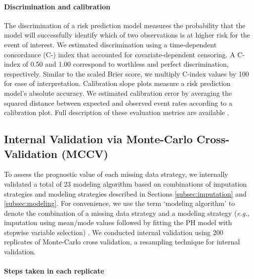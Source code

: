 \documentclass{article}
\begin{document}
\paragraph{Discrimination and calibration}

The discrimination of a risk prediction model measures the probability
that the model will successfully identify which of two observations is
at higher risk for the event of interest. We estimated discrimination
using a time-dependent concordance (C-) index that accounted for
covariate-dependent censoring. A C-index of 0.50 and 1.00 correspond to
worthless and perfect discrimination, respectively. Similar to the
scaled Brier score, we multiply C-index values by 100 for ease of
interpretation. Calibration slope plots measure a risk prediction
model's absolute accuracy. We estimated calibration error by averaging
the squared distance between expected and observed event rates according
to a calibration plot. Full description of these evaluation metrics are
available \cite{gerds2014calibration, gerds2013estimating}.

\hypertarget{internal-validation-via-monte-carlo-cross-validation-mccv}{%
\subsection{Internal Validation via Monte-Carlo Cross-Validation
(MCCV)}\label{internal-validation-via-monte-carlo-cross-validation-mccv}}

\label{subsec:internal}

To assess the prognostic value of each missing data strategy, we
internally validated a total of 23 modeling algorithm based on
combinations of imputation strategies and modeling strategies described
in Sections \ref{subsec:imputation} and \ref{subsec:modeling}. For
convenience, we use the term `modeling algorithm' to denote the
combination of a missing data strategy and a modeling strategy
(\textit{e.g., }imputation using mean/mode values followed by fitting
the PH model with stepwise variable selection) \cite{kuhn2013applied}.
We conducted internal validation using 200 replicates of Monte-Carlo
cross validation, a resampling technique for internal validation.

\paragraph{Steps taken in each replicate}
\end{document}
